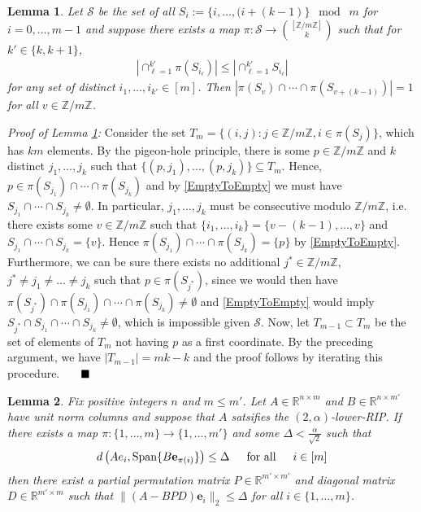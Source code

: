 \documentclass[journal,onecolumn]{IEEEtran}
\newtheorem{lemma}{Lemma}
\begin{document}

\begin{lemma}\label{NonEmptyLemma} Let $\mathcal{S}$ be the set of all $S_i := \{i, \ldots, (i + (k-1) \} \;\bmod\; m$ for $i = 0, \ldots, m-1$ and suppose there exists a map $\pi: \mathcal{S} \to {[\mathbb{Z}/m\mathbb{Z}] \choose k}$ such that for $k' \in \{k, k+1\}$,
\begin{align}\label{EmptyToEmpty}
|\cap_{\ell = 1}^{k'}\pi(S_{i_\ell})| \leq |\cap_{\ell=1}^{k'} S_{i_\ell} |
\end{align}
%
for any set of distinct $i_1, \ldots, i_{k'} \in [m]$. Then  $|\pi(S_v) \cap \cdots \cap \pi(S_{v+(k-1)})| = 1$ for all $v \in \mathbb{Z}/m\mathbb{Z}$.
\end{lemma}

\emph{Proof of Lemma \ref{NonEmptyLemma}:} Consider the set $T_m = \{ (i,j) : j \in \mathbb{Z}/m\mathbb{Z}, i \in \pi(S_j) \}$, which has $km$ elements. By the pigeon-hole principle, there is some $p \in \mathbb{Z}/m\mathbb{Z}$ and $k$ distinct $j_1, \ldots, j_k$ such that $\{(p, j_1), \ldots, (p,j_k)\} \subseteq T_m$. Hence, $p \in \pi(S_{j_1}) \cap \cdots \cap \pi(S_{j_k})$ and by \eqref{EmptyToEmpty} we must have $S_{j_1} \cap \cdots \cap S_{j_k} \neq \emptyset$. In particular, $j_1, \ldots, j_k$ must be consecutive modulo $\mathbb{Z}/m\mathbb{Z}$, i.e. there exists some $v \in \mathbb{Z}/m\mathbb{Z}$ such that $\{i_1, \ldots, i_k\} = \{v - (k-1), \ldots, v\}$ and $S_{j_1} \cap \cdots \cap S_{j_k} = \{v\}$. Hence $\pi(S_{j_1}) \cap \cdots \cap \pi(S_{j_k}) = \{p\}$ by \eqref{EmptyToEmpty}. Furthermore, we can be sure there exists no additional $j^* \in \mathbb{Z}/m\mathbb{Z}$, $j^* \neq j_1 \neq \ldots \neq j_k$ such that $p \in \pi(S_{j^*})$, since we would then have $\pi(S_{j^*}) \cap \pi(S_{j_1}) \cap \cdots \cap \pi(S_{j_k}) \neq \emptyset$ and \eqref{EmptyToEmpty} would imply $S_{j^*} \cap S_{j_1} \cap \cdots \cap S_{j_k} \neq \emptyset$, which is impossible given $\mathcal{S}$. Now, let $T_{m-1} \subset T_m$ be the set of elements of $T_m$ not having $p$ as a first coordinate. By the preceding argument, we have $|T_{m-1}| = mk - k$ and the proof follows by iterating this procedure. $\indent \blacksquare$


\begin{lemma}\label{VectorUniquenessLemma}
Fix positive integers $n$ and $m \leq m'$. Let $A\in \mathbb{R}^{n \times m}$ and $B \in \mathbb{R}^{n \times m'}$ have unit norm columns and suppose that $A$ satsifies the $(2,\alpha)$-lower-RIP. If there exists a map $\pi: \{1, \ldots, m\} \to \{1, \ldots, m'\}$ and some $\Delta < \frac{\alpha}{\sqrt{2}}$ such that 
\begin{align}\label{VULcondition}
d\left( Ae_i, \text{Span}\{B\mathbf{e}_{\pi(i)}\} \right) \leq \Delta \indent \text{for all} \indent i \in [m]
\end{align}
%
then there exist a partial permutation matrix $P \in \mathbb{R}^{m' \times m'}$ and diagonal matrix $D \in \mathbb{R}^{m' \times m}$ such that $\|(A - BPD)\mathbf{e}_i\|_2 \leq \Delta$ for all $i \in \{1, \ldots, m\}$.
\end{lemma}
\end{document}
